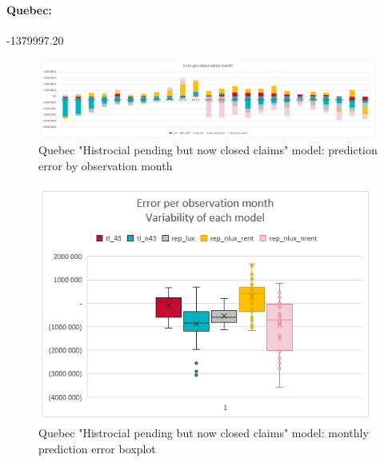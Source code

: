	\paragraph{Quebec:}
		-1379997.20
		\begin{figure}[H]
			\begin{center}
				\includegraphics[scale=0.2]{Graphiques/QC_closedonly_model_by_month} 
				\renewcommand{\figurename}{Figure}
				\caption{Quebec "Histrocial pending but now closed claims" model: prediction error by observation month}\label{Fig_QC_closedonly_er_by_month}
			\end{center}
		\end{figure}
		\begin{figure}[H]
			\begin{center}
				\includegraphics[scale=0.2]{Graphiques/QC_closedonly_model_mustach} 
				\renewcommand{\figurename}{Figure}
				\caption{Quebec "Histrocial pending but now closed claims" model: monthly prediction error boxplot}\label{Fig_QC_closedonly_er_boxplot}
			\end{center}
		\end{figure}

